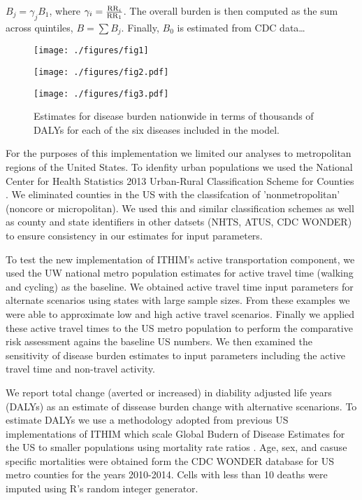 $B_j = \gamma_jB_1$, where $\gamma_i = \frac{\mathrm{RR}_i}{\mathrm{RR}_1}$.  The
overall burden is then computed as the sum across quintiles,
$B=\sum B_j$.  Finally, $B_0$ is estimated from CDC data\ldots


\begin{figure}[t]
  \centerline{\texttt{[image: ./figures/fig1]}}
    \caption{}\label{fig1}
\end{figure}

\begin{figure}[t]
  \centerline{\texttt{[image: ./figures/fig2.pdf]}}
    \caption{}\label{fig2}
\end{figure}

\begin{figure}[t]
  \centerline{\texttt{[image: ./figures/fig3.pdf]}}
  \caption{Estimates for disease burden nationwide in terms of thousands of
    DALYs for each of the six diseases included in the model.
  }\label{fig3}
\end{figure}


For the purposes of this implementation we limited our analyses to
metropolitan regions of the United States. To idenfity urban
populations we used the National Center for Health Statistics 2013
Urban-Rural Classification Scheme for Counties \cite{ingram2014}. We
eliminated counties in the US with the classifcation of
'nonmetropolitan' (noncore or micropolitan). We used this and similar
classification schemes as well as county and state identifiers in
other datsets (NHTS, ATUS, CDC WONDER) to ensure consistency in our
estimates for input parameters.

To test the new implementation of ITHIM's active transportation
component, we used the UW national metro population estimates for
active travel time (walking and cycling) as the baseline. We obtained
active travel time input parameters for alternate scenarios using
states with large sample sizes. From these examples we were able to
approximate low and high active travel scenarios. Finally we applied
these active travel times to the US metro population to perform the
comparative risk assessment agains the baseline US numbers. We then
examined the sensitivity of disease burden estimates to input
parameters including the active travel time and non-travel activity.

We report total change (averted or increased) in diability adjusted
life years (DALYs) as an estimate of dissease burden change with
alternative scenarions. To estimate DALYs we use a methodology adopted
from previous US implementations of ITHIM which scale Global Budern of
Disease Estimates for the US to smaller populations using mortality
rate ratios \cite{maizlish2013}. Age, sex, and casuse specific
mortalities were obtained form the CDC WONDER database for US metro
counties for the years 2010-2014. Cells with less than 10 deaths were
imputed using R's random integer generator.
